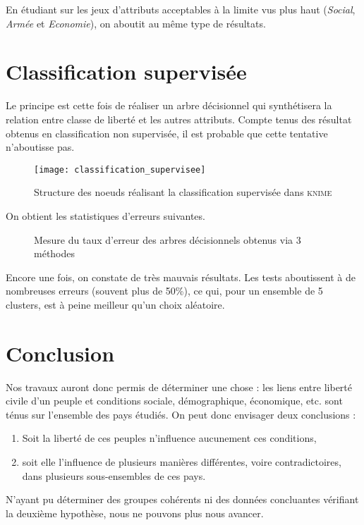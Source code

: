 En étudiant sur les jeux d'attributs \og acceptables à la limite \fg vus plus haut (\emph{Social}, \emph{Armée} et \emph{Economie}), on aboutit au même type de résultats.

\section{Classification supervisée}
Le principe est cette fois de réaliser un arbre décisionnel qui synthétisera la relation entre classe de liberté et les autres attributs. Compte tenus des résultat obtenus en classification non supervisée, il est probable que cette tentative n'aboutisse pas.

\begin{figure}[H]
	\centering
	\texttt{[image: classification\_supervisee]}
	\caption{Structure des noeuds réalisant la classification supervisée dans \textsc{knime}}
\end{figure}


On obtient les statistiques d'erreurs suivantes.
\begin{figure}[H]
	\centering
	\caption{Mesure du taux d'erreur des arbres décisionnels obtenus via 3 méthodes}
\end{figure}

Encore une fois, on constate de très mauvais résultats. Les tests aboutissent à de nombreuses erreurs (souvent plus de 50\%), ce qui, pour un ensemble de 5 clusters, est à peine meilleur qu'un choix aléatoire.


\section{Conclusion}
Nos travaux auront donc permis de déterminer une chose : les liens entre liberté civile d'un peuple et conditions sociale, démographique, économique, etc. sont ténus sur l'ensemble des pays étudiés. On peut donc envisager deux conclusions :
\begin{enumerate}
	\item Soit la liberté de ces peuples n'influence aucunement ces conditions,
	\item soit elle l'influence de plusieurs manières différentes, voire contradictoires, dans plusieurs sous-ensembles de ces pays.
\end{enumerate}
N'ayant pu déterminer des groupes cohérents ni des données concluantes vérifiant la deuxième hypothèse, nous ne pouvons plus nous avancer.

